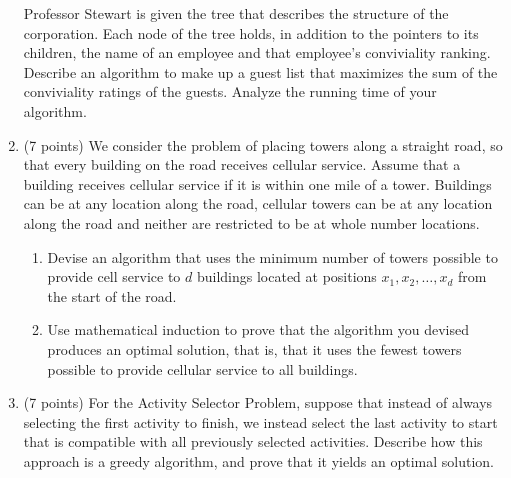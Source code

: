 \documentclass[12pt]{report}
\begin{document}
\begin{enumerate}[label=\arabic*.]
	Professor Stewart is given the tree that describes the structure of the corporation. Each node of the tree holds, in addition to the pointers to its children, the name of an employee and that employee's conviviality ranking. Describe an algorithm to make up a guest list that maximizes the sum of the conviviality ratings of the guests. Analyze the running time of your algorithm.
	\item (7 points) We consider the problem of placing towers along a straight road, so that every building on the road receives cellular service. Assume that a building receives cellular service if it is within one mile of a tower. Buildings can be at any location along the road, cellular towers can be at any location along the road and neither are restricted to be at whole number locations.
	\begin{enumerate}[label=\arabic{enumi}\alph*)]
	    \item Devise an algorithm that uses the minimum number of towers possible to provide cell service to $d$ buildings located at positions $x_{1}, x_{2}, \dots, x_{d}$ from the start of the road.
		\item Use mathematical induction to prove that the algorithm you devised produces an optimal solution, that is, that it uses the fewest towers possible to provide cellular service to all buildings.
	\end{enumerate}
	\item (7 points) For the Activity Selector Problem, suppose that instead of always selecting the first activity to finish, we instead select the last activity to start that is compatible with all previously selected activities. Describe how this approach is a greedy algorithm, and prove that it yields an optimal solution.
\end{enumerate}
\end{document}
